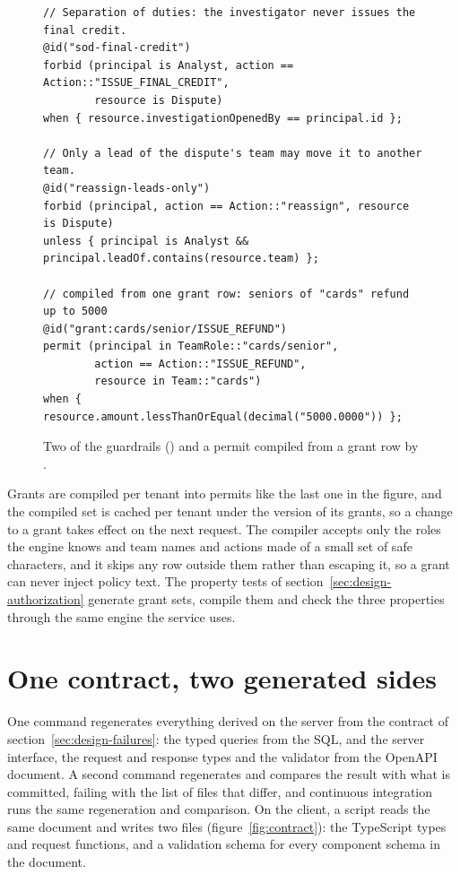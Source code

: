 \begin{figure}[htbp]
\begin{lstlisting}
// Separation of duties: the investigator never issues the final credit.
@id("sod-final-credit")
forbid (principal is Analyst, action == Action::"ISSUE_FINAL_CREDIT",
        resource is Dispute)
when { resource.investigationOpenedBy == principal.id };

// Only a lead of the dispute's team may move it to another team.
@id("reassign-leads-only")
forbid (principal, action == Action::"reassign", resource is Dispute)
unless { principal is Analyst && principal.leadOf.contains(resource.team) };

// compiled from one grant row: seniors of "cards" refund up to 5000
@id("grant:cards/senior/ISSUE_REFUND")
permit (principal in TeamRole::"cards/senior",
        action == Action::"ISSUE_REFUND",
        resource in Team::"cards")
when { resource.amount.lessThanOrEqual(decimal("5000.0000")) };
\end{lstlisting}
\caption{Two of the guardrails () and a permit compiled from a grant row by
.}
\label{fig:guardrails}
\end{figure}

Grants are compiled per tenant into permits like the last one in the figure, and the compiled set is cached per tenant
under the version of its grants, so a change to a grant takes effect on the next request. The compiler accepts only the roles the engine knows and team names and actions made of a
small set of safe characters, and it skips any row outside them rather than escaping it, so a grant can never
inject policy text. The property tests of section~\ref{sec:design-authorization} generate grant sets, compile them
and check the three properties through the same engine the service uses.

\section{One contract, two generated sides}
\label{sec:impl-contract}

One command regenerates everything derived on the server from the contract of section~\ref{sec:design-failures}:
the typed queries from the SQL, and the server interface, the request and response types and the validator from
the OpenAPI document. A second command regenerates and compares the result with what is committed, failing with
the list of files that differ, and continuous integration runs the same regeneration and comparison. On the
client, a script reads the same document and writes two files (figure~\ref{fig:contract}): the TypeScript types
and request functions, and a validation schema for every component schema in the document.

